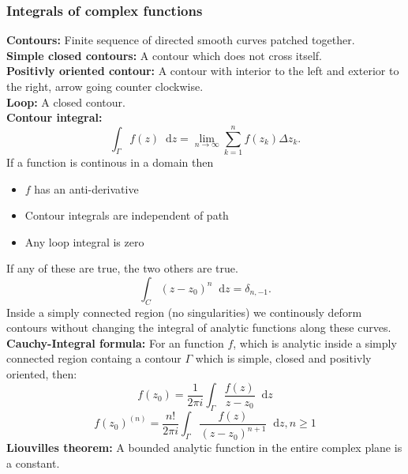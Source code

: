 \documentclass[a4paper, 10pt]{article}
\newcommand*\diff{\mathop{}\!\mathrm{d}}
\begin{document}
\begin{multicols*}{3}
\subsubsection*{Integrals of complex functions}
\textbf{Contours:} Finite sequence of directed smooth curves patched together.\\
\textbf{Simple closed contours:} A contour which does not cross itself.\\
\textbf{Positivly oriented contour:} A contour with interior to the left and exterior to the right, arrow going counter clockwise.\\
\textbf{Loop:} A closed contour.\\
\textbf{Contour integral:}
\begin{equation*}
  \int_{\Gamma} f(z) \diff z = \lim_{n\to\infty} \sum_{k=1}^{n} f(z_k) \Delta z_k.
\end{equation*}
If a function is continous in a domain then
\begin{itemize}
  \item $f$ has an anti-derivative
  \item Contour integrals are independent of path
  \item Any loop integral is zero
\end{itemize}
If any of these are true, the two others are true.\\
\begin{equation*}
  \int_{C} (z-z_0)^n \diff z = \delta_{n, -1}.
\end{equation*}
Inside a simply connected region (no singularities) we continously deform contours without changing the integral of analytic functions along these curves.\\
\textbf{Cauchy-Integral formula:}
For an function $f$, which is analytic inside a simply connected region containg a contour $\Gamma$ which is simple, closed and positivly oriented, then:
\begin{equation*}
  f(z_0) = \frac{1}{2\pi i} \int_{\Gamma} \frac{f(z)}{z-z_0} \diff z
\end{equation*}
\begin{equation*}
  f(z_0)^{(n)} = \frac{n!}{2\pi i} \int_{\Gamma} \frac{f(z)}{(z-z_0)^{n+1}} \diff z, n\geq 1
\end{equation*}
\textbf{Liouvilles theorem:} A bounded analytic function in the entire complex plane is a constant.\\

\end{multicols*}
\end{document}
